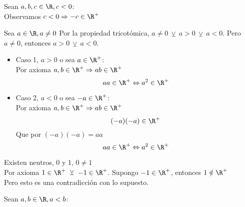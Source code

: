 \documentclass[10pt]{article}
\begin{document}
\begin{prf}{}
	Sean $a,b,c \in \R, c<0$:\\
	Observamos $c<0 \Rightarrow -c \in \R^+$\\

\end{prf}

\begin{prf}{}
	Sea $a \in \R, a \neq 0$
	Por la propiedad tricotómica, $a \neq 0\ \veebar\ a > 0\ \veebar\ a < 0$.
	Pero $a \neq 0$, entonces $a > 0\ \veebar\ a < 0$.\\

	\begin{itemize}
		\item Caso 1, $a > 0$ o sea $a \in \R^+$:\\
		Por axioma $a,b \in \R^+ \Rightarrow ab \in \R^+$
		$$aa \in \R^+ \Leftrightarrow a^2 \in \R^+$$
		\item Caso 2, $a < 0$ o sea $-a \in \R^+$:\\
		Por axioma $a,b \in \R^+ \Rightarrow ab \in \R^+$
		$$(-a)(-a) \in \R^+$$
		Que por $(-a)(-a) = aa$
		$$aa \in \R^+ \Leftrightarrow a^2 \in \R^+$$
	\end{itemize}
\end{prf}

\begin{prf}[$1 \in \R^+$]{}
	Existen neutros, 0 y 1, $0 \neq 1$\\
	Por axioma $1 \in \R^+\ \veebar\ -1 \in \R^+$.
	Supongo $-1 \in \R^+$, entonces $1 \notin \R^+$\\
	\lreqn{1 \in \R^+}{}
	Pero esto es una contradicción con lo supuesto.
\end{prf}

\begin{prf}[$a < b \Leftarrow -b < -a$]{}
	Sean $a,b \in \R, a < b$:\\

\end{prf}

\begin{prf}{}
\end{prf}
\end{document}
